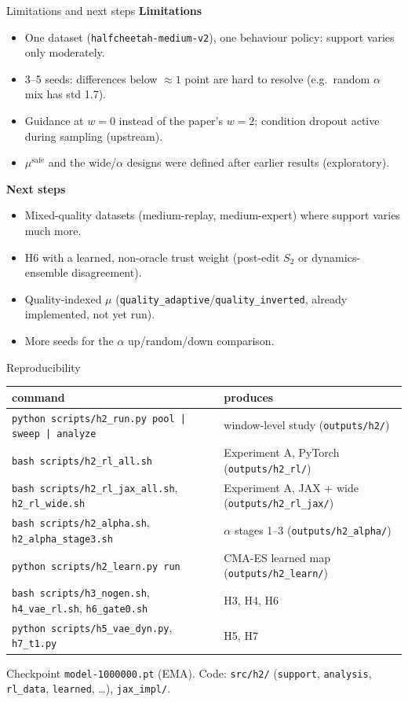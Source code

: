 \documentclass[aspectratio=169,11pt]{beamer}
\newcommand{\cond}[1]{\texttt{#1}}
\begin{document}
\begin{frame}[shrink=10]{Limitations and next steps}
\small
\textbf{Limitations}
\begin{itemize}
\item One dataset (\texttt{halfcheetah-medium-v2}), one behaviour policy: support varies only moderately.
\item 3--5 seeds: differences below $\approx1$ point are hard to resolve (e.g.\ random $\alpha$ mix has std 1.7).
\item Guidance at $w=0$ instead of the paper's $w=2$; condition dropout active during sampling (upstream).
\item $\mu^{\text{safe}}$ and the wide/$\alpha$ designs were defined after earlier results (exploratory).
\end{itemize}
\vspace{0.4em}
\textbf{Next steps}
\begin{itemize}
\item Mixed-quality datasets (medium-replay, medium-expert) where support varies much more.
\item H6 with a learned, non-oracle trust weight (post-edit $S_2$ or dynamics-ensemble disagreement).
\item Quality-indexed $\mu$ (\cond{quality\_adaptive}/\cond{quality\_inverted}, already implemented, not yet run).
\item More seeds for the $\alpha$ up/random/down comparison.
\end{itemize}
\end{frame}

\begin{frame}{Reproducibility}
\scriptsize
\begin{tabularx}{\linewidth}{lY}
\toprule
command & produces\\
\midrule
\texttt{python scripts/h2\_run.py pool | sweep | analyze} & window-level study (\texttt{outputs/h2/})\\
\texttt{bash scripts/h2\_rl\_all.sh} & Experiment A, PyTorch (\texttt{outputs/h2\_rl/})\\
\texttt{bash scripts/h2\_rl\_jax\_all.sh}, \texttt{h2\_rl\_wide.sh} & Experiment A, JAX + wide (\texttt{outputs/h2\_rl\_jax/})\\
\texttt{bash scripts/h2\_alpha.sh}, \texttt{h2\_alpha\_stage3.sh} & $\alpha$ stages 1--3 (\texttt{outputs/h2\_alpha/})\\
\texttt{python scripts/h2\_learn.py run} & CMA-ES learned map (\texttt{outputs/h2\_learn/})\\
\texttt{bash scripts/h3\_nogen.sh}, \texttt{h4\_vae\_rl.sh}, \texttt{h6\_gate0.sh} & H3, H4, H6\\
\texttt{python scripts/h5\_vae\_dyn.py}, \texttt{h7\_t1.py} & H5, H7\\
\bottomrule
\end{tabularx}
\vspace{0.4em}

Checkpoint \texttt{model-1000000.pt} (EMA). Code: \texttt{src/h2/} (\texttt{support}, \texttt{analysis}, \texttt{rl\_data}, \texttt{learned}, \dots), \texttt{jax\_impl/}.
\end{frame}
\end{document}
